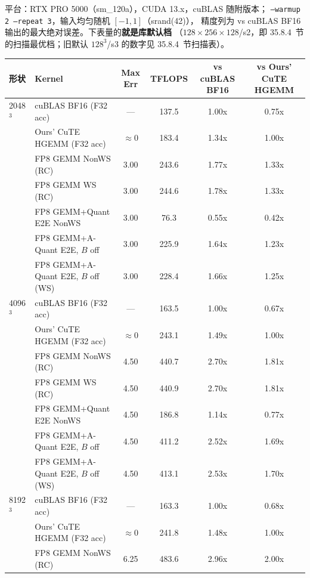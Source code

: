 平台：RTX PRO 5000（sm\_120a），CUDA 13.x，cuBLAS 随附版本；
\texttt{--warmup 2 --repeat 3}，输入均匀随机 $[-1,1]$（srand(42)），
精度列为 vs cuBLAS BF16 输出的最大绝对误差。下表量的\textbf{就是库默认档}
（$128\times256\times128$/s2，即 35.8.4~节的扫描最优档；旧默认
$128^3$/s3 的数字见 35.8.4~节扫描表）。

\begin{center}
\scriptsize
\begin{tabular}{llcccc}
\toprule
形状 & Kernel & Max Err & TFLOPS & vs cuBLAS BF16 & vs Ours' CuTE HGEMM \\
\midrule
2048$^3$ & cuBLAS BF16 (F32 acc)       & ---   & 137.5 & 1.00x & 0.75x \\
          & Ours' CuTE HGEMM (F32 acc)  & $\approx$0 & 183.4 & 1.34x & 1.00x \\
          & FP8 GEMM NonWS (RC)         & 3.00  & 243.6 & 1.77x & 1.33x \\
          & FP8 GEMM WS (RC)            & 3.00  & 244.6 & 1.78x & 1.33x \\
          & FP8 GEMM+Quant E2E NonWS    & 3.00  &  76.3 & 0.55x & 0.42x \\
          & FP8 GEMM+A-Quant E2E, $B$ off & 3.00 & 225.9 & 1.64x & 1.23x \\
          & FP8 GEMM+A-Quant E2E, $B$ off (WS) & 3.00 & 228.4 & 1.66x & 1.25x \\
\midrule
4096$^3$ & cuBLAS BF16 (F32 acc)       & ---   & 163.5 & 1.00x & 0.67x \\
          & Ours' CuTE HGEMM (F32 acc)  & $\approx$0 & 243.1 & 1.49x & 1.00x \\
          & FP8 GEMM NonWS (RC)         & 4.50  & 440.7 & 2.70x & 1.81x \\
          & FP8 GEMM WS (RC)            & 4.50  & 440.9 & 2.70x & 1.81x \\
          & FP8 GEMM+Quant E2E NonWS    & 4.50  & 186.8 & 1.14x & 0.77x \\
          & FP8 GEMM+A-Quant E2E, $B$ off & 4.50 & 411.2 & 2.52x & 1.69x \\
          & FP8 GEMM+A-Quant E2E, $B$ off (WS) & 4.50 & 413.1 & 2.53x & 1.70x \\
\midrule
8192$^3$ & cuBLAS BF16 (F32 acc)       & ---   & 163.3 & 1.00x & 0.68x \\
          & Ours' CuTE HGEMM (F32 acc)  & $\approx$0 & 241.8 & 1.48x & 1.00x \\
          & FP8 GEMM NonWS (RC)         & 6.25  & 483.6 & 2.96x & 2.00x \\

\end{tabular}
\end{center}
